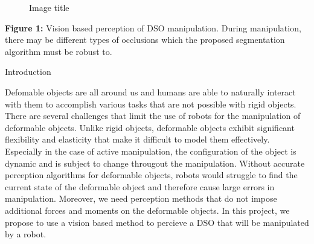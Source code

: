\begin{figure}
\centering
{}
\caption{Image title}
\end{figure}

\textbf{Figure 1:} Vision based perception of DSO manipulation. During
manipulation, there may be different types of occlusions which the
proposed segmentation algorithm must be robust to.

Introduction

Defomable objects are all around us and humans are able to naturally
interact with them to accomplish various tasks that are not possible
with rigid objects. There are several challenges that limit the use of
robots for the manipulation of deformable objects. Unlike rigid objects,
deformable objects exhibit significant flexibility and elasticity that
make it difficult to model them effectively. Especially in the case of
active manipulation, the configuration of the object is dynamic and is
subject to change througout the manipulation. Without accurate
perception algorithms for deformable objects, robots would struggle to
find the current state of the deformable object and therefore cause
large errors in manipulation. Moreover, we need perception methods that
do not impose additional forces and moments on the deformable objects.
In this project, we propose to use a vision based method to percieve a
DSO that will be manipulated by a robot.

